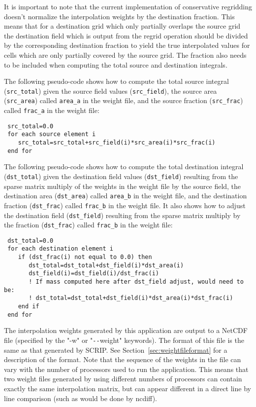  It is important to note that the current implementation of conservative regridding doesn't normalize the interpolation weights by the destination fraction. 
This means that for a destination grid which only partially overlaps the source grid the destination field which is output from the regrid operation should 
be divided by the corresponding destination fraction to yield the true interpolated values for cells which are only partially covered by the source grid. 
The fraction also needs to be included when computing the total source and destination integrals. 

 The following pseudo-code shows how to compute the total source integral ({\tt src\_total}) given the source field values ({\tt src\_field}), the source area ({\tt src\_area}) called {\tt area\_a} in the weight file, and the source fraction ({\tt src\_frac}) called {\tt frac\_a} in the weight file:

\begin{verbatim}
 src_total=0.0
 for each source element i
    src_total=src_total+src_field(i)*src_area(i)*src_frac(i)
 end for
\end{verbatim}

The following pseudo-code shows how to compute the total destination integral ({\tt dst\_total}) given the destination field values ({\tt dst\_field}) resulting
from the sparse matrix multiply of the weights in the weight file by the source field, the destination area ({\tt dst\_area}) called {\tt area\_b} in the
weight file, and the destination fraction ({\tt dst\_frac}) called {\tt frac\_b} in the weight file. It also 
shows how to adjust the destination field ({\tt dst\_field}) resulting from the sparse matrix multiply by the fraction 
({\tt dst\_frac}) called {\tt frac\_b} in the weight file: 

\begin{verbatim}
 dst_total=0.0
 for each destination element i
    if (dst_frac(i) not equal to 0.0) then
       dst_total=dst_total+dst_field(i)*dst_area(i) 
       dst_field(i)=dst_field(i)/dst_frac(i)
       ! If mass computed here after dst_field adjust, would need to be:
       ! dst_total=dst_total+dst_field(i)*dst_area(i)*dst_frac(i) 
    end if
 end for
\end{verbatim}

The interpolation weights generated by this application are output to a NetCDF file (specified by the "-w" or "\verb+--+weight"
keywords). The format of this file is the same as that generated by SCRIP. See Section~\ref{sec:weightfileformat} for a description of the format.
Note that the sequence of the weights in the file can 
vary with the number of processors used to run the application. This means that two weight files generated by using different
numbers of processors can contain exactly the same interpolation matrix, but can appear different in a direct line by line
comparison (such as would be done by ncdiff).

